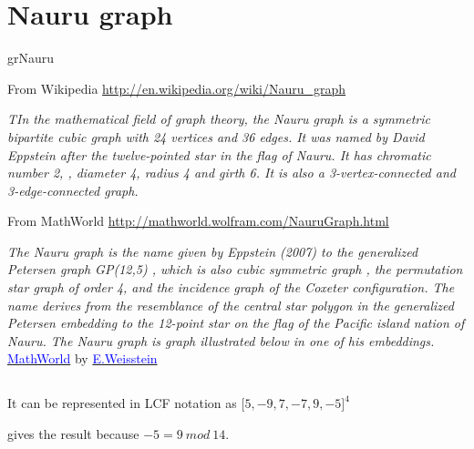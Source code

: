 \newpage\section{Nauru graph}\label{nauru}
\begin{NewMacroBox}{grNauru}{} 
  
From Wikipedia \url{http://en.wikipedia.org/wiki/Nauru_graph}

\emph{TIn the mathematical field of graph theory, the Nauru graph is a symmetric bipartite cubic graph with 24 vertices and 36 edges. It was named by David Eppstein after the twelve-pointed star in the flag of Nauru. It has chromatic number 2, , diameter 4, radius 4 and girth 6. It is also a 3-vertex-connected and 3-edge-connected graph.}

\medskip
From MathWorld \url{http://mathworld.wolfram.com/NauruGraph.html}

\emph{The Nauru graph is the name given by Eppstein (2007) to the generalized Petersen graph GP(12,5) , which is also cubic symmetric graph , the permutation star graph of order 4, and the incidence graph of the Coxeter configuration. The name derives from the resemblance of the central star polygon in the generalized Petersen embedding to the 12-point star on the flag of the Pacific island nation of Nauru. The Nauru graph is  graph illustrated below in one of his embeddings.}
\href{http://mathworld.wolfram.com/topics/GraphTheory.html}%
           {\textcolor{blue}{MathWorld}} by \href{http://en.wikipedia.org/wiki/Eric_W._Weisstein}%
           {\textcolor{blue}{E.Weisstein}}   
\end{NewMacroBox} 

\subsection{}

It can be represented in LCF notation as  $\big[5, −9, 7, −7, 9, −5\big]^4$

 gives the result because  $-5 = 9\ mod\  14$.

\subsection{}
\begin{center}
\begin{tkzexample}[vbox]
\end{tkzexample} 
\end{center}


\vfill\endinput